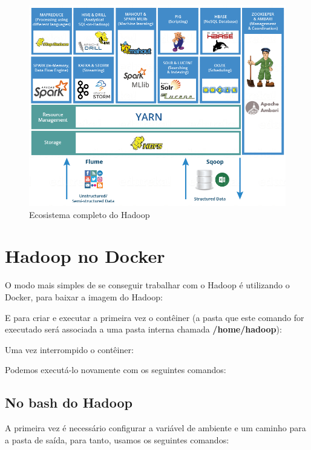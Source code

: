 \documentclass[a4paper,11pt]{article}
\begin{document}
\begin{figure}[H]
	\centering
	\includegraphics[width=1.0\textwidth]{imgHadoop/ecosistema.png}
	\caption{Ecosistema completo do Hadoop}
\end{figure}

\section{Hadoop no Docker}
O modo mais simples de se conseguir trabalhar com o Hadoop é utilizando o Docker, para baixar a imagem do Hadoop: \\

E para criar e executar a primeira vez o contêiner (a pasta que este comando for executado será associada a uma pasta interna chamada \textbf{/home/hadoop}): \\

Uma vez interrompido o contêiner: \\

Podemos executá-lo novamente com os seguintes comandos: \\

\subsection{No bash do Hadoop}
A primeira vez é necessário configurar a variável de ambiente e um caminho para a pasta de saída, para tanto, usamos os seguintes comandos: \\
\end{document}
